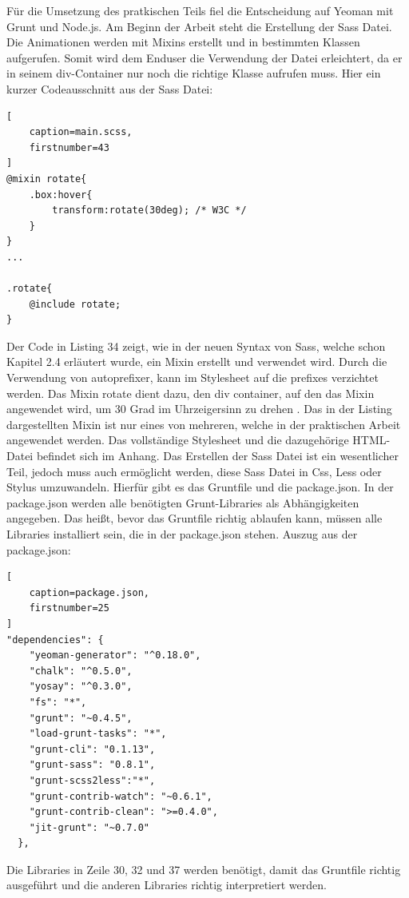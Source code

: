 Für die Umsetzung des pratkischen Teils fiel die Entscheidung auf  Yeoman mit Grunt und Node.js.\newline
Am Beginn der Arbeit steht die Erstellung der Sass Datei. Die Animationen werden mit Mixins erstellt und in bestimmten Klassen aufgerufen. Somit wird dem Enduser die Verwendung der Datei erleichtert, da er in seinem div-Container nur noch die richtige Klasse aufrufen muss.
Hier ein kurzer Codeausschnitt aus der Sass Datei:
\begin{lstlisting}[
	caption=main.scss,
	firstnumber=43
]
@mixin rotate{
	.box:hover{
		transform:rotate(30deg); /* W3C */
	}
}
...

.rotate{
	@include rotate;
}

\end{lstlisting}
Der Code in Listing 34 zeigt, wie in der neuen Syntax von Sass, welche schon Kapitel 2.4 erläutert wurde, ein Mixin erstellt und verwendet wird. Durch die Verwendung von autoprefixer, kann im Stylesheet auf die prefixes verzichtet werden.\newline
Das Mixin rotate dient dazu, den div container, auf den das Mixin angewendet wird, um 30 Grad im Uhrzeigersinn zu drehen . Das in der Listing dargestellten Mixin ist nur eines von mehreren, welche in der praktischen Arbeit angewendet werden. Das vollständige Stylesheet und die dazugehörige HTML-Datei befindet sich im Anhang. \newline\newline
Das Erstellen der Sass Datei ist ein wesentlicher Teil, jedoch muss auch ermöglicht werden, diese Sass Datei in Css, Less oder Stylus umzuwandeln. Hierfür gibt es das Gruntfile und die package.json.
In der package.json werden alle benötigten Grunt-Libraries als Abhängigkeiten angegeben. Das heißt, bevor das Gruntfile richtig ablaufen kann, müssen alle Libraries installiert sein, die in der package.json stehen.\newline
Auszug aus der package.json:
\begin{lstlisting}[
	caption=package.json,
	firstnumber=25
]
"dependencies": {
    "yeoman-generator": "^0.18.0",
    "chalk": "^0.5.0",
    "yosay": "^0.3.0",
    "fs": "*",
    "grunt": "~0.4.5",
    "load-grunt-tasks": "*",
    "grunt-cli": "0.1.13",
    "grunt-sass": "0.8.1",
    "grunt-scss2less":"*",
    "grunt-contrib-watch": "~0.6.1",
    "grunt-contrib-clean": ">=0.4.0",
    "jit-grunt": "~0.7.0"
  },
\end{lstlisting}
Die Libraries in Zeile 30, 32 und 37 werden benötigt, damit das Gruntfile richtig ausgeführt und die anderen Libraries richtig interpretiert werden.
